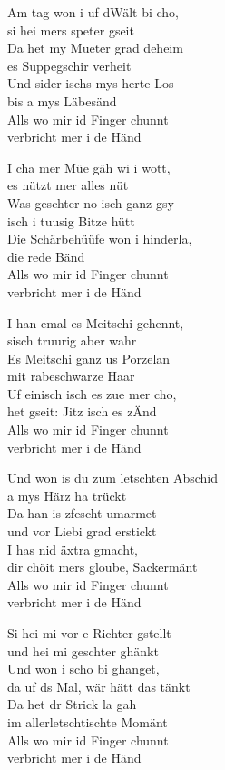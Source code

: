\documentclass[
  letterpaper,
  twoside=false]{scrbook}
\begin{document}
Am tag won i uf d\textquotesingle Wält bi cho,\\
si hei mers speter gseit\\
Da het my Mueter grad deheim\\
es Suppegschir verheit\\
Und sider ischs mys herte Los\\
bis a mys Läbesänd\\
Alls wo mir id Finger chunnt\\
verbricht mer i de Händ

I cha mer Müe gäh wi i wott,\\
es nützt mer alles nüt\\
Was geschter no isch ganz gsy\\
isch i tuusig Bitze hütt\\
Die Schärbehüüfe won i hinderla,\\
die rede Bänd\\
Alls wo mir id Finger chunnt\\
verbricht mer i de Händ

I han emal es Meitschi gchennt,\\
s\textquotesingle isch truurig aber wahr\\
Es Meitschi ganz us Porzelan\\
mit rabeschwarze Haar\\
Uf einisch isch es zue mer cho,\\
het gseit: Jitz isch es z\textquotesingle Änd\\
Alls wo mir id Finger chunnt\\
verbricht mer i de Händ

Und won i\textquotesingle s du zum letschten Abschid\\
a mys Härz ha trückt\\
Da han i\textquotesingle s z\textquotesingle fescht umarmet\\
und vor Liebi grad erstickt\\
I has nid äxtra gmacht,\\
dir chöit mers gloube, Sackermänt\\
Alls wo mir id Finger chunnt\\
verbricht mer i de Händ

Si hei mi vor e Richter gstellt\\
und hei mi geschter ghänkt\\
Und won i scho bi ghanget,\\
da uf ds Mal, wär hätt das tänkt\\
Da het dr Strick la gah\\
im allerletschtischte Momänt\\
Alls wo mir id Finger chunnt\\
verbricht mer i de Händ
\end{document}
